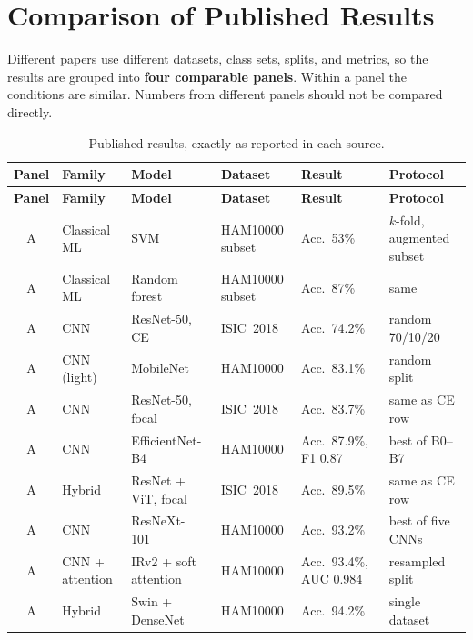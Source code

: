 \documentclass[10pt,a4paper]{article}
\begin{document}
\section{Comparison of Published Results}
Different papers use different datasets, class sets, splits, and
metrics, so the results are grouped into \textbf{four comparable
panels}. Within a panel the conditions are similar. Numbers from
different panels should not be compared directly.

{\small
\renewcommand{\arraystretch}{1.15}
\begin{longtable}{@{}c L{2.1cm} L{3.6cm} L{2.4cm} L{3.1cm} L{3.0cm}@{}}
\caption{Published results, exactly as reported in each source.}\label{tab:results}\\
\toprule
\textbf{Panel} & \textbf{Family} & \textbf{Model} & \textbf{Dataset} & \textbf{Result} & \textbf{Protocol} \\
\midrule
\endfirsthead
\toprule
\textbf{Panel} & \textbf{Family} & \textbf{Model} & \textbf{Dataset} & \textbf{Result} & \textbf{Protocol} \\
\midrule
\endhead
A & Classical ML & SVM~\cite{shetty2022} & HAM10000 subset & Acc.\ 53\% & $k$-fold, augmented subset \\
A & Classical ML & Random forest~\cite{shetty2022} & HAM10000 subset & Acc.\ 87\% & same \\
A & CNN & ResNet-50, CE~\cite{nie2023hybrid} & ISIC~2018 & Acc.\ 74.2\% & random 70/10/20 \\
A & CNN (light) & MobileNet~\cite{chaturvedi2020mobilenet} & HAM10000 & Acc.\ 83.1\% & random split \\
A & CNN & ResNet-50, focal~\cite{nie2023hybrid} & ISIC~2018 & Acc.\ 83.7\% & same as CE row \\
A & CNN & EfficientNet-B4~\cite{ali2022efficientnets} & HAM10000 & Acc.\ 87.9\%, F1 0.87 & best of B0--B7 \\
A & Hybrid & ResNet + ViT, focal~\cite{nie2023hybrid} & ISIC~2018 & Acc.\ 89.5\% & same as CE row \\
A & CNN & ResNeXt-101~\cite{chaturvedi2020mtap} & HAM10000 & Acc.\ 93.2\% & best of five CNNs \\
A & CNN + attention & IRv2 + soft attention~\cite{datta2021soft} & HAM10000 & Acc.\ 93.4\%, AUC 0.984 & resampled split \\
A & Hybrid & Swin + DenseNet~\cite{karthik2024} & HAM10000 & Acc.\ 94.2\% & single dataset \\

\end{longtable}}
\end{document}
